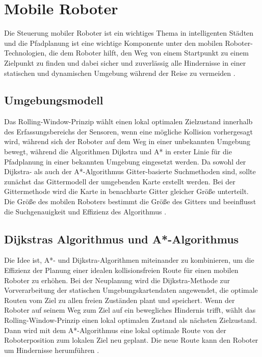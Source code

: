 \newpage
\section{Mobile Roboter}
\label{Mobile Roboter}
Die Steuerung mobiler Roboter ist ein wichtiges Thema in intelligenten Städten und die Pfadplanung ist eine wichtige Komponente unter den mobilen Roboter-Technologien, die dem Roboter hilft, den Weg von einem Startpunkt zu einem Zielpunkt zu finden und dabei sicher und zuverlässig alle Hindernisse in einer statischen und dynamischen Umgebung während der Reise zu vermeiden \cite{Myung21,Hong-mei17}.

\subsection{Umgebungsmodell}
Das Rolling-Window-Prinzip wählt einen lokal optimalen Zielzustand innerhalb des Erfassungsbereichs der Sensoren, wenn eine mögliche Kollision vorhergesagt wird, während sich der Roboter auf dem Weg in einer unbekannten Umgebung bewegt, während die Algorithmen Dijkstra und A* in erster Linie für die Pfadplanung in einer bekannten Umgebung eingesetzt werden.
\newline
Da sowohl der Dijkstra- als auch der A*-Algorithmus Gitter-basierte Suchmethoden sind, sollte zunächst das Gittermodell der umgebenden Karte erstellt werden. Bei der Gittermethode wird die Karte in benachbarte Gitter gleicher Größe unterteilt. 
Die Größe des mobilen Roboters bestimmt die Größe des Gitters und beeinflusst die Suchgenauigkeit und Effizienz des Algorithmus \cite{Hong-mei17}.

\subsection{Dijkstras Algorithmus und A*-Algorithmus}

Die Idee ist, A*- und Dijkstra-Algorithmen miteinander zu kombinieren, um die Effizienz der Planung einer idealen kollisionsfreien Route für einen mobilen Roboter zu erhöhen. Bei der Neuplanung wird die Dijkstra-Methode zur Vorverarbeitung der statischen Umgebungskartendaten angewendet, die optimale Routen vom Ziel zu allen freien Zuständen plant und speichert. Wenn der Roboter auf seinem Weg zum Ziel auf ein bewegliches Hindernis trifft, wählt das Rolling-Window-Prinzip einen lokal optimalen Zustand als nächsten Zielzustand. Dann wird mit dem A*-Algorithmus eine lokal optimale Route von der Roboterposition zum lokalen Ziel neu geplant.
Die neue Route kann den Roboter um Hindernisse herumführen \cite{Hong-mei17}.

